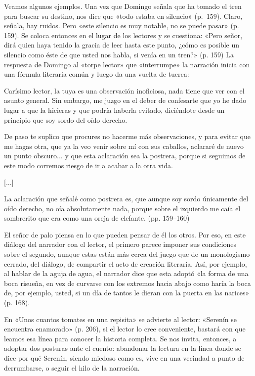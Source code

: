 \documentclass[14pt,twoside,final]{extbook} %
\begin{document}
Veamos algunos ejemplos. Una vez que Domingo señala que ha tomado el tren para buscar su destino, nos dice que «todo estaba en silencio» (p.~159). Claro, señala, hay ruidos. Pero «este silencio es muy notable, no se puede pasar» (p. 159). Se coloca entonces en el lugar de los lectores y se cuestiona: «Pero señor, dirá quien haya tenido la gracia de leer hasta este punto, ¿cómo es posible un silencio como éste de que usted nos habla, si venía en un tren?» (p. 159) La respuesta de Domingo al «torpe lector» que «interrumpe» la narración inicia con una fórmula literaria común y luego da una vuelta de tuerca:
\begin{quoting}
Carísimo lector, la tuya es una observación inoficiosa, nada tiene que ver con el asunto general. Sin embargo, me juzgo en el deber de confesarte que yo he dado lugar a que la hicieras y que podría haberla evitado, diciéndote desde un principio que soy sordo del oído derecho.

De paso te suplico que procures no hacerme más observaciones, y para evitar que me hagas otra, que ya la veo venir sobre mí con sus caballos, aclararé de nuevo un punto obscuro... y que esta aclaración sea la postrera, porque si seguimos de este modo corremos riesgo de ir a acabar a la otra vida.

\centerline{[...]}

La aclaración que señalé como postrera es, que aunque soy sordo únicamente del oído derecho, no oía absolutamente nada, porque sobre el izquierdo me caía el sombrerito que era como una oreja de elefante. (pp. 159--160)
\end{quoting}
El señor de palo piensa en lo que pueden pensar de él los otros. Por eso, en este diálogo del narrador con el lector, el primero parece imponer sus condiciones sobre el segundo, aunque estas están más cerca del juego que de un monologismo cerrado, del diálogo, de compartir el acto de creación literaria. Así, por ejemplo, al hablar de la aguja de agua, el narrador dice que esta adoptó «la forma de una boca risueña, en vez de curvarse con los extremos hacia abajo como haría la boca de, por ejemplo, usted, si un día de tantos le dieran con la puerta en las narices» (p. 168).

En «Unos cuantos tomates en una repisita» se advierte al lector: «Serenín se encuentra enamorado» (p. 206), si el lector lo cree conveniente, bastará con que leamos esa línea para conocer la historia completa. Se nos invita, entonces, a adoptar dos posturas ante el cuento: abandonar la lectura en la línea donde se dice por qué Serenín, siendo miedoso como es, vive en una vecindad a punto de derrumbarse, o seguir el hilo de la narración.
\end{document}
